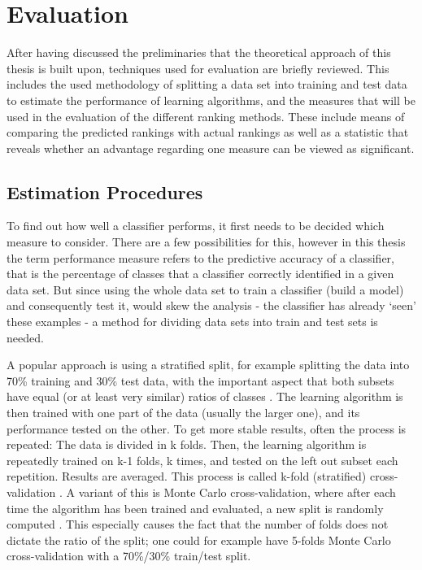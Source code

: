 \section{Evaluation}

After having discussed the preliminaries that the theoretical approach of this thesis is built upon, techniques used for evaluation are briefly reviewed. This includes the used methodology of splitting a data set into training and test data to estimate the performance of learning algorithms, and the measures that will be used in the evaluation of the different ranking methods. These include means of comparing the predicted rankings with actual rankings as well as a statistic that reveals whether an advantage regarding one measure can be viewed as significant.

\subsection{Estimation Procedures}

To find out how well a classifier performs, it first needs to be decided which measure to consider. There are a few possibilities for this, however in this thesis the term performance measure refers to the predictive accuracy of a classifier, that is the percentage of classes that a classifier correctly identified in a given data set. But since using the whole data set to train a classifier (build a model) and consequently test it, would skew the analysis - the classifier has already `seen' these examples - a method for dividing data sets into train and test sets is needed. 

A popular approach is using a stratified split, for example splitting the data into 70\% training and 30\% test data, with the important aspect that both subsets have equal (or at least very similar) ratios of classes \cite{kohavi1995study}. The learning algorithm is then trained with one part of the data (usually the larger one), and its performance tested on the other. To get more stable results, often the process is repeated: The data is divided in k folds. Then, the learning algorithm is repeatedly trained on k-1 folds, k times, and tested on the left out subset each repetition. Results are averaged. This process is called k-fold (stratified) cross-validation \cite{kohavi1995study}. A variant of this is Monte Carlo cross-validation, where after each time the algorithm has been trained and evaluated, a new split is randomly computed \cite{xu2001monte}. This especially causes the fact that the number of folds does not dictate the ratio of the split; one could for example have 5-folds Monte Carlo cross-validation with a 70\%/30\% train/test split.

